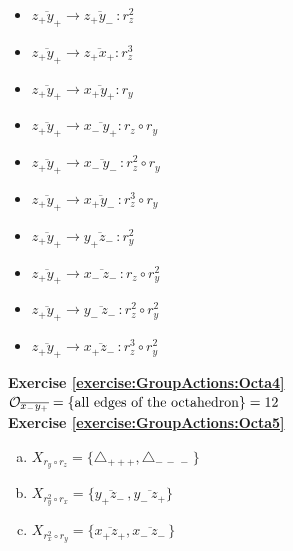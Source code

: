 \begin{enumerate}[(a)]
\begin{multicols}{2}
\begin{itemize}
	\item
	$\overline{z_+y_+} \rightarrow \overline{z_+y_-\,}: r_z^2$
	
	\item
	$\overline{z_+y_+} \rightarrow \overline{z_+x_+}: r_z^3$
	
	\item
	$\overline{z_+y_+} \rightarrow \overline{x_+y_+}: r_y$
	
	\item
	$\overline{z_+y_+} \rightarrow \overline{x_-\,y_+}: r_z \circ r_y$
	
	\item
	$\overline{z_+y_+} \rightarrow \overline{x_-\,y_-\,}: r_z^2 \circ r_y$
	
	\item
	$\overline{z_+y_+} \rightarrow \overline{x_+y_-\,}: r_z^3 \circ r_y$
	
	\item
	$\overline{z_+y_+} \rightarrow \overline{y_+z_-\,}: r_y^2$
	
	\item
	$\overline{z_+y_+} \rightarrow \overline{x_-\,z_-\,}: r_z \circ r_y^2$
	
	\item
	$\overline{z_+y_+} \rightarrow \overline{y_-\,z_-\,}: r_z^2 \circ r_y^2$
	
	\item
	$\overline{z_+y_+} \rightarrow \overline{x_+z_-\,}: r_z^3 \circ r_y^2$
	\end{itemize}
	\end{multicols}
\end{enumerate}

\noindent\textbf{Exercise \ref{exercise:GroupActions:Octa4}}
\\
${\cal O}_{\overline{x_-y_+}} = \{\text{all edges of the octahedron}\} = 12$
\\

\noindent\textbf{Exercise \ref{exercise:GroupActions:Octa5}}
\begin{enumerate}[(a)]
\item 
$X_{r_{y}\circ r_{z}}= \{\triangle_{ +++}, \triangle_{-\,-\,-\,}\}$

\item 
$X_{r_{y}^2\circ r_{x}}=\{\overline {y_+z_-\,},\overline{y_-\,z_+}\}$

\item
$X_{r_{x}^2\circ r_{y}}=\{\overline {x_+z_+},\overline{x_-\,z_-\,}\}$ 
\end{enumerate}

